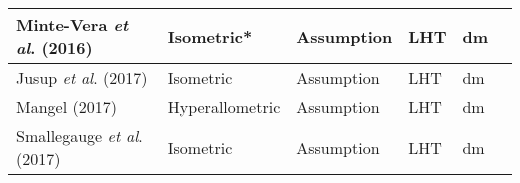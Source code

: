 \documentclass{article}
\begin{document}
\begin{table}[]
\begin{tabularx}{\textwidth}{|l|l|l|l|X|X|}
    Minte-Vera \textit{et al}. (2016)       & Isometric*       & Assumption         & LHT                   & dm                                                                                                                                                    \\ \hline
    Jusup \textit{et al}. (2017)            & Isometric        & Assumption         & LHT                   & dm                                                                                                                                                    \\ \hline
    Mangel (2017)                           & Hyperallometric  & Assumption         & LHT                   & dm                                                                                                                                                    \\ \hline
    Smallegauge \textit{et al}. (2017)      & Isometric        & Assumption         & LHT                   & dm                                                                                                                                                    \\ \hline
\end{tabularx}
\end{table}




\end{document}

